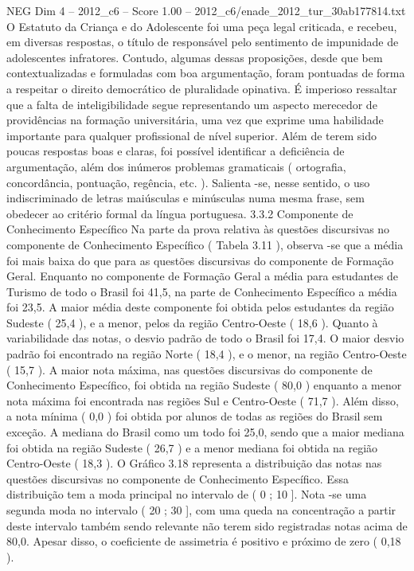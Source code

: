 \begin{textsample}{NEG Dim 4 – 2012\_c6 – Score 1.00 – 2012\_c6/enade\_2012\_tur\_30ab177814.txt}
O Estatuto da Criança e do Adolescente foi uma peça legal criticada, e recebeu, em diversas respostas, o título de responsável pelo sentimento de impunidade de adolescentes infratores.
Contudo, algumas dessas proposições, desde que bem contextualizadas e formuladas com boa argumentação, foram pontuadas de forma a respeitar o direito democrático de pluralidade opinativa.
É imperioso ressaltar que a falta de inteligibilidade segue representando um aspecto merecedor de providências na formação universitária, uma vez que exprime uma habilidade importante para qualquer profissional de nível superior.
Além de terem sido poucas respostas boas e claras, foi possível identificar a deficiência de argumentação, além dos inúmeros problemas gramaticais ( ortografia, concordância, pontuação, regência, etc. ).
Salienta -se, nesse sentido, o uso indiscriminado de letras maiúsculas e minúsculas numa mesma frase, sem obedecer ao critério formal da língua portuguesa. 3.3.2 Componente de Conhecimento Específico Na parte da prova relativa às questões discursivas no componente de Conhecimento Específico ( Tabela 3.11 ), observa -se que a média foi mais baixa do que para as questões discursivas do componente de Formação Geral.
Enquanto no componente de Formação Geral a média para estudantes de Turismo de todo o Brasil foi 41,5, na parte de Conhecimento Específico a média foi 23,5.
A maior média deste componente foi obtida pelos estudantes da região Sudeste ( 25,4 ), e a menor, pelos da região Centro-Oeste ( 18,6 ).
Quanto à variabilidade das notas, o desvio padrão de todo o Brasil foi 17,4.
O maior desvio padrão foi encontrado na região Norte ( 18,4 ), e o menor, na região Centro-Oeste ( 15,7 ).
A maior nota máxima, nas questões discursivas do componente de Conhecimento Específico, foi obtida na região Sudeste ( 80,0 ) enquanto a menor nota máxima foi encontrada nas regiões Sul e Centro-Oeste ( 71,7 ).
Além disso, a nota mínima ( 0,0 ) foi obtida por alunos de todas as regiões do Brasil sem exceção.
A mediana do Brasil como um todo foi 25,0, sendo que a maior mediana foi obtida na região Sudeste ( 26,7 ) e a menor mediana foi obtida na região Centro-Oeste ( 18,3 ).
O Gráfico 3.18 representa a distribuição das notas nas questões discursivas no componente de Conhecimento Específico.
Essa distribuição tem a moda principal no intervalo de ( 0 ; 10 ].
Nota -se uma segunda moda no intervalo ( 20 ; 30 ], com uma queda na concentração a partir deste intervalo também sendo relevante não terem sido registradas notas acima de 80,0.
Apesar disso, o coeficiente de assimetria é positivo e próximo de zero ( 0,18 ).

\end{textsample}
